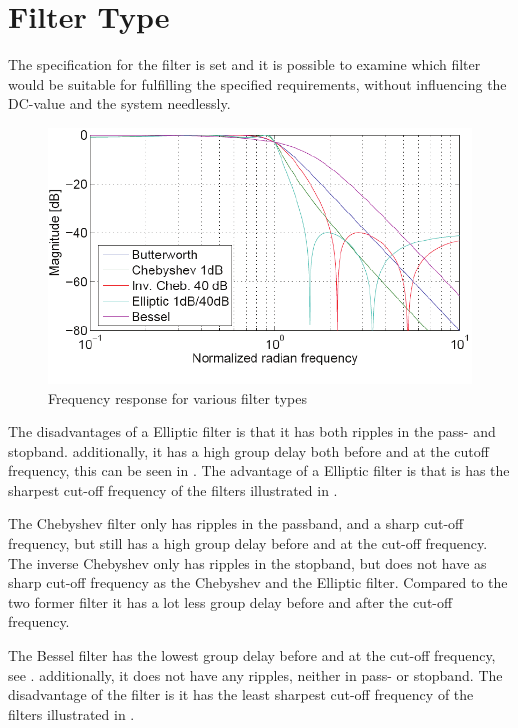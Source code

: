 \section{Filter Type}
The specification for the filter is set and it is possible to examine which filter would be suitable for fulfilling the specified requirements, without influencing the DC-value and the system needlessly.

\begin{figure}[H]
	\centering
	\includegraphics[scale=1]{figures/Filtertypes1.pdf}
	\caption{Frequency response for various filter types}
	\label{fig:Filtertype1}
\end{figure}

The disadvantages of a Elliptic filter is that it has both ripples in the pass- and stopband. additionally, it has a high group delay both before and at the cutoff frequency, this can be seen in . The advantage of a Elliptic filter is that is has the sharpest cut-off frequency of the filters illustrated in .

The Chebyshev filter only has ripples in the passband, and a sharp cut-off frequency, but still has a high group delay before and at the cut-off frequency. The inverse Chebyshev only has ripples in the stopband, but does not have as sharp cut-off frequency as the Chebyshev and the Elliptic filter. Compared to the two former filter it has a lot less group delay before and after the cut-off frequency.

The Bessel filter has the lowest group delay before and at the cut-off frequency, see . additionally, it does not have any ripples, neither in pass- or stopband. The disadvantage of the filter is it has the least sharpest cut-off frequency of the filters illustrated in .

